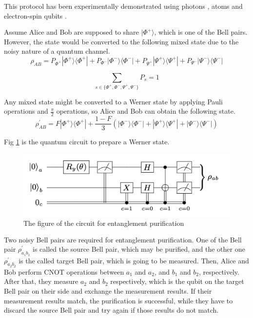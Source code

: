 This protocol has been experimentally demonstrated using photons \cite{Yan:21}, atoms \cite{179436} and electron-spin qubits \cite{kalb2017entanglement}.


Assume Alice and Bob are supposed to share $|\Phi^+\rangle$, which is one of the Bell pairs. However, the state would be converted to the following mixed state due to the noisy nature of a quantum channel.
\begin{equation}
  \rho_{AB} = P_{\Phi^+}|\Phi^+\rangle\langle\Phi^+| + P_{\Phi^-}|\Phi^-\rangle\langle\Phi^-| + P_{\Psi^+}|\Psi^+\rangle\langle\Psi^+| + P_{\Psi^-}|\Psi^-\rangle\langle\Psi^-|
\end{equation}

\begin{equation}
  \sum_{s \in \{\Phi^+, \Phi^-, \Psi^+, \Psi^- \}} P_{s} = 1
\end{equation}


Any mixed state might be converted to a Werner state by applying Pauli operations and $\frac{\pi}{2}$ operations, so Alice and Bob can obtain the following state.
\begin{equation}
  \rho^{'}_{AB} = F|\Phi^+\rangle\langle\Phi^+| + \frac{1-F}{3}(|\Phi^-\rangle\langle\Phi^-| + |\Psi^+\rangle\langle\Psi^+| + |\Psi^-\rangle\langle\Psi^-|)
\end{equation}

Fig \ref{background:werner-state} is the quantum circuit to prepare a Werner state.

\begin{figure}[H]
  \centerline{\includegraphics[width=0.8\columnwidth]{images/circuit_werner_state.png}}
  \caption{The figure of the circuit for entanglement purification \cite{riedel2021bell}}
  \label{background:werner-state}
\end{figure}


Two noisy Bell pairs are required for entanglement purification. One of the Bell pair $\rho^{'}_{a_1 b_1}$ is called the source Bell pair, which may be purified, and the other one $\rho^{'}_{a_2 b_2}$  is the called target Bell pair, which is going to be measured. 
Then, Alice and Bob perform CNOT operations between $a_1$ and $a_2$, and $b_1$ and $b_2$, respectively.
After that, they measure $a_2$ and $b_2$ respectively, which is the qubit on the target Bell pair on their side and exchange the measurement results. 
If their measurement results match, the purification is successful, while they have to discard the source Bell pair and try again if those results do not match.

